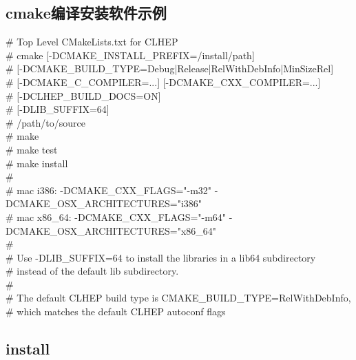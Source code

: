 \documentclass[11pt,a4paper,titlepage]{article}
\begin{document}
\subsection{\kai cmake编译安装软件示例}
\# Top Level CMakeLists.txt for CLHEP\\
\#  cmake [-DCMAKE\_INSTALL\_PREFIX=/install/path] \\
\#        [-DCMAKE\_BUILD\_TYPE=Debug|Release|RelWithDebInfo|MinSizeRel]\\
\#        [-DCMAKE\_C\_COMPILER=...] [-DCMAKE\_CXX\_COMPILER=...]\\
\#        [-DCLHEP\_BUILD\_DOCS=ON]\\
\#        [-DLIB\_SUFFIX=64]\\
\#        /path/to/source\\
\#  make\\
\#  make test\\
\#  make install\\
\#\\
\# mac i386:   -DCMAKE\_CXX\_FLAGS="-m32" -DCMAKE\_OSX\_ARCHITECTURES="i386"\\
\# mac x86\_64: -DCMAKE\_CXX\_FLAGS="-m64" -DCMAKE\_OSX\_ARCHITECTURES="x86\_64"\\
\#\\
\# Use -DLIB\_SUFFIX=64 to install the libraries in a lib64 subdirectory\\
\# instead of the default lib subdirectory.  \\
\#\\
\# The default CLHEP build type is CMAKE\_BUILD\_TYPE=RelWithDebInfo,\\
\# which matches the default CLHEP autoconf flags\\

\subsection{install}
\end{document}
